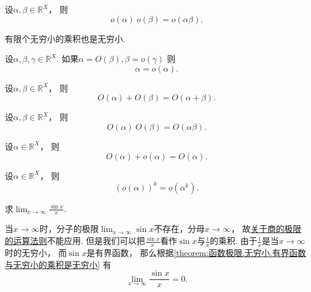 \begin{proposition}
设\(\alpha,\beta\in\mathbb{R}^X\)，
则\[
	o(\alpha)~o(\beta) = o(\alpha \beta).
\]
\end{proposition}
\begin{corollary}
有限个无穷小的乘积也是无穷小.
\end{corollary}

\begin{proposition}
设\(\alpha,\beta,\gamma\in\mathbb{R}^X\).
如果\(\alpha = O(\beta),
\beta = o(\gamma)\)
则\[
	\alpha = o(\alpha).
\]
\end{proposition}
\begin{proposition}
设\(\alpha,\beta\in\mathbb{R}^X\)，
则\[
	O(\alpha) + O(\beta) = O(\alpha + \beta).
\]
\end{proposition}
\begin{proposition}
设\(\alpha,\beta\in\mathbb{R}^X\)，
则\[
	O(\alpha)~O(\beta) = O(\alpha \beta).
\]
\end{proposition}
\begin{proposition}
设\(\alpha\in\mathbb{R}^X\)，
则\[
	O(\alpha) + o(\alpha) = O(\alpha).
\]
\end{proposition}
\begin{proposition}
设\(\alpha\in\mathbb{R}^X\)，
则\[
	(o(\alpha))^k = o(\alpha^k).
\]
\end{proposition}

\begin{example}
求\(\lim_{x\to\infty} \frac{\sin x}{x}\).
\begin{solution}
当\(x\to\infty\)时，分子的极限\(\lim_{x\to\infty} \sin x\)不存在，分母\(x\to\infty\)，
故\hyperref[theorem:极限.极限的四则运算法则]{关于商的极限的运算法则}不能应用.
但是我们可以把\(\frac{\sin x}{x}\)看作\(\sin x\)与\(\frac1x\)的乘积.
由于\(\frac1x\)是当\(x\to\infty\)时的无穷小，
而\(\sin x\)是有界函数，
那么根据\cref{theorem:函数极限.无穷小.有界函数与无穷小的乘积是无穷小}
有\begin{equation}
	\lim_{x\to\infty} \frac{\sin x}{x} = 0.
\end{equation}
\end{solution}
\end{example}

